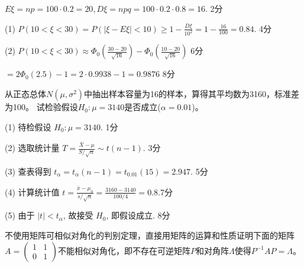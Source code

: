 \begin{solution}
$E\xi = n p = 100 \cdot 0.2 = 20, D\xi = n p q = 100 \cdot 0.2 \cdot 0.8 = 16$. \dotfill 2分 \par
(1) $P (10 < \xi < 30) = P (| \xi - E \xi | < 10) \geq 1 - \frac{D\xi}{10^2}
     = 1 - \frac{16}{100} = 0.84$. \dotfill 4分 \par
(2) $P (10 < \xi < 30) \approx \Phi_0 \left( \frac{30 - 20}{\sqrt{16}}\right)
     - \Phi_0 \left( \frac{10 - 20}{\sqrt{16}} \right)$ \dotfill 6分\par
\qquad $= 2 \Phi_0 (2.5) - 1 = 2 \cdot 0.9938 - 1 =0.9876$ \dotfill 8分
\end{solution}

\begin{question}
从正态总体$N(\mu,\sigma^2)$中抽出样本容量为16的样本，算得其平均数为3160，标准差为100。
试检验假设$H_0:\mu=3140$是否成立($\alpha = 0.01$)。
\end{question}

\begin{solution}
(1) 待检假设 $H_0 : \mu = 3140$. \dotfill 1分\par
(2) 选取统计量 $T = \frac{\bar{X}-\mu}{S / \sqrt{n}} \sim t(n-1)$. \dotfill 3分 \par
(3) 查表得到 $t_{\alpha} = t_{\alpha} (n - 1) = t_{0.01} (15) =2.947$. \dotfill 5分 \par
(4) 计算统计值 $t = \frac{\bar{x} - \mu_0}{s/\sqrt{n}} =\frac{3160-3140}{100/4} = 0.8$.\dotfill 7分 \par
(5) 由于 $| t | < t_{\alpha}$, 故接受 $H_0$, 即假设成立. \dotfill 8分
\end{solution}


\begin{question}
不使用矩阵可相似对角化的判别定理，直接用矩阵的运算和性质证明下面的矩阵$A
=\left(\begin{array}{cc}
  1 & 1\\
  0 & 1
\end{array}\right)$不能相似对角化，即不存在可逆矩阵$P$和对角阵$\Lambda$使得$P^{-1}AP=\Lambda$。
\end{question}


